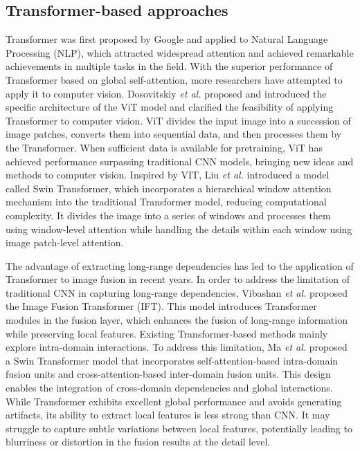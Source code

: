 \subsection{Transformer-based approaches}
Transformer \cite{vaswani2017attention} was first proposed by Google and applied to Natural Language Processing (NLP), which attracted widespread attention and achieved remarkable achievements in multiple tasks in the field.
With the superior performance of Transformer based on global self-attention, more researchers have attempted to apply it to computer vision.
Dosovitskiy \textit{et al.} \cite{dosovitskiy2020image} proposed and introduced the specific architecture of the ViT model and clarified the feasibility of applying Transformer to computer vision.
ViT divides the input image into a succession of image patches, converts them into sequential data, and then processes them by the Transformer.
When sufficient data is available for pretraining, ViT has achieved performance surpassing traditional CNN models, bringing new ideas and methods to computer vision.
Inspired by VIT, Liu \textit{et al.} \cite{liu2021swin} introduced a model called Swin Transformer, which incorporates a hierarchical window attention mechanism into the traditional Transformer model, reducing computational complexity.
It divides the image into a series of windows and processes them using window-level attention while handling the details within each window using image patch-level attention.

The advantage of extracting long-range dependencies has led to the application of Transformer to image fusion in recent years.
In order to address the limitation of traditional CNN in capturing long-range dependencies, Vibashan \textit{et al.} \cite{vs2022image} proposed the Image Fusion Transformer (IFT).
This model introduces Transformer modules in the fusion layer, which enhances the fusion of long-range information while preserving local features.
Existing Transformer-based methods mainly explore intra-domain interactions.
To address this limitation, Ma \textit{et al.} \cite{Ma2022SwinFusion} proposed a Swin Transformer model that incorporates self-attention-based intra-domain fusion units and cross-attention-based inter-domain fusion units.
This design enables the integration of cross-domain dependencies and global interactions.
While Transformer exhibits excellent global performance and avoids generating artifacts, its ability to extract local features is less strong than CNN.
It may struggle to capture subtle variations between local features, potentially leading to blurriness or distortion in the fusion results at the detail level.

